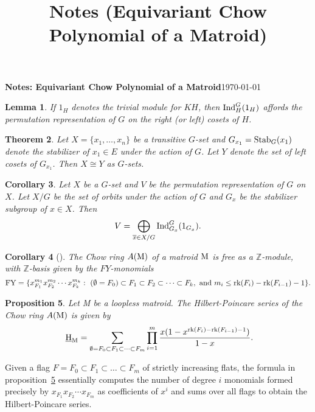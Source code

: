 \documentclass[10pt]{article}
\title{Notes (Equivariant Chow Polynomial of a Matroid)}
\newcommand{\bz}{\mathbb{Z}}
\newcommand{\ind}{\text{\normalfont Ind}}
\newcommand{\stab}{\text{\normalfont Stab}}
\newcommand{\hilbM}{\normalfont\text{ \underline{H}}_\text{M}}
\newcommand{\rank}{\normalfont\text{rk}}
\newcommand{\matM}{\normalfont\text{M}}
\newtheorem{theorem}{Theorem}
\newtheorem{corollary}[theorem]{Corollary}
\newtheorem{lemma}[theorem]{Lemma}
\newtheorem{proposition}[theorem]{Proposition}
\theoremstyle{remark}
\begin{document}
{\textbf{Notes: Equivariant Chow Polynomial of a Matroid}}\hfill {\small{\today}}

\hrulefill
\begin{lemma}
    If $1_H$ denotes the trivial module for $KH$, then $\ind_H^G(1_H)$ affords the permutation representation
    of $G$ on the right (or left) cosets of $H$.
\end{lemma}

\begin{theorem}
    Let $X = \{x_1,\ldots, x_n\}$ be a transitive $G$-set and $G_{x_1} = \stab_G(x_1)$ denote the
    stabilizer of $x_1\in E$ under the action of $G$. Let $Y$ denote the set of left cosets of $G_{x_1}$.
    Then $X\cong Y$ as $G$-sets.
\end{theorem}

\begin{corollary}
    Let $X$ be a $G$-set and $V$ be the permutation representation of $G$ on $X$. Let $X/G$ be the set of orbits
    under the action of $G$ and $G_x$ be the stabilizer subgroup of $x\in X$. Then
    $$V = \bigoplus_{\overline{x}\in X/G}{\ind_{G_x}^G(1_{G_x})}.$$
\end{corollary}

\hrulefill

\begin{corollary}
    [\cite{fy-2004}\cite{angarone2024chowringsmatroidspermutation}]
    The Chow ring $A(\matM)$ of a matroid $\matM$
    is free as a $\bz$-module, with $\bz$-basis given by the $FY$-monomials
        $$\text{FY}=\{x_{F_1}^{m_1}x_{F_2}^{m_2}\cdots x_{F_k}^{m_k}:\ (\emptyset = F_0)\subset
        F_1\subset F_2\subset\cdots\subset
        F_k,\ \text{and}\ m_i\leq\rank(F_i)-\rank(F_{i-1})-1 \}.$$
\end{corollary}


\begin{proposition}
    \label{prop:fy-formula}
    Let M be a loopless matroid. The Hilbert-Poincare series of the Chow ring $A(\matM)$ is given by
    $$\hilbM = \sum_{\emptyset = F_0\subset F_1\subset \cdots\subset F_m}{\prod_{i=1}^m{
        \frac{x(1-x^{\rank(F_i)-\rank(F_{i-1})-1})}{1-x}}}.$$
\end{proposition}

\hspace*{5mm}
Given a flag $F = F_0\subset F_1\subset\ldots\subset F_m$ of strictly increasing flats, the formula in
proposition~\ref{prop:fy-formula} essentially computes the number of degree $i$ monomials formed
precisely by $x_{F_1}x_{F_2}\cdots x_{F_m}$ as coefficients of $x^i$ and sums over all flags to obtain the
Hilbert-Poincare series.
\end{document}
